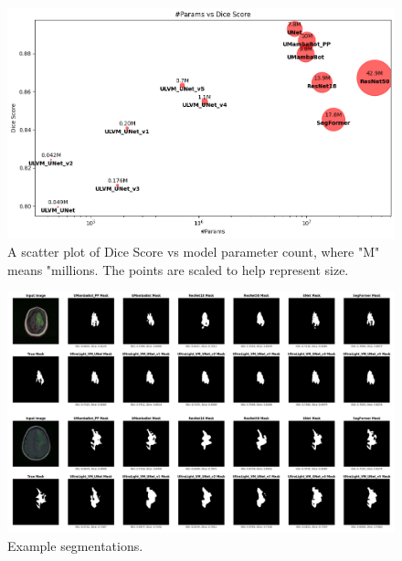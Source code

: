 \documentclass[conference]{IEEEtran}
\begin{document}
\begin{figure}[!t]
    \centering
    \includegraphics[width=\columnwidth]{imgs/balls.png}
    \caption{A scatter plot of Dice Score vs model parameter count, where "M" means "millions. The points are scaled to help represent size.}
    \label{fig:balls}
\end{figure}

\begin{figure}[!t]
    \centering
    \includegraphics[width=\columnwidth]{imgs/masks.png}
    \caption{Example segmentations.}
    \label{fig:segs}
\end{figure}
\end{document}
